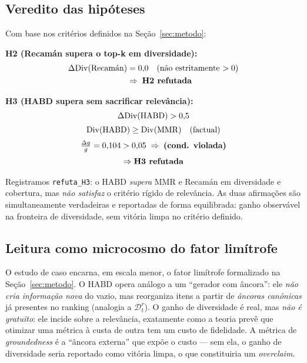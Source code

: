 \subsection{Veredito das hipóteses}

Com base nos critérios definidos na Seção~\ref{sec:metodo}:

\textbf{H2 (Recamán supera o top-k em diversidade):}
\[
\begin{aligned}
\Delta\mathrm{Div}(\text{Recam\'an}) &= 0{,}0
  \quad \text{(n\~ao estritamente $>0$)}\\
&\Rightarrow\; \textbf{H2 refutada}
\end{aligned}
\]

\textbf{H3 (HABD supera sem sacrificar relevância):}
\[
\begin{gathered}
\Delta\mathrm{Div}(\mathrm{HABD}) > 0{,}5\\[2pt]
\mathrm{Div}(\mathrm{HABD}) \ge \mathrm{Div}(\mathrm{MMR}) \quad \text{(factual)}\\[2pt]
\tfrac{\Delta g}{g} = 0{,}104 > 0{,}05
   \;\Rightarrow\; \textbf{(cond. violada)}\\[2pt]
\Rightarrow \textbf{H3 refutada}
\end{gathered}
\]

Registramos \texttt{refuta\_H3}: o HABD \emph{supera} MMR e Recamán em
diversidade e cobertura, mas \emph{não satisfaz} o critério rígido de
relevância. As duas afirmações são simultaneamente verdadeiras e reportadas de
forma equilibrada: ganho observável na fronteira de diversidade, sem vitória
limpa no critério definido.

\subsection{Leitura como microcosmo do fator limítrofe}

O estudo de caso encarna, em escala menor, o fator limítrofe formalizado na
Seção~\ref{sec:metodo}. O HABD opera análogo a um ``gerador com âncora'': ele
\emph{não cria informação nova} do vazio, mas reorganiza itens a partir de
\emph{âncoras canônicas} já presentes no ranking (analogia a $\mathcal{D}_t^r$).
O ganho de diversidade é real, mas \emph{não é gratuito}: ele incide sobre a
relevância, exatamente como a teoria prevê que otimizar uma métrica à custa de
outra tem um custo de fidelidade. A métrica de \emph{groundedness} é a ``âncora
externa'' que expõe o custo --- sem ela, o ganho de diversidade seria reportado
como vitória limpa, o que constituiria um \emph{overclaim}.
